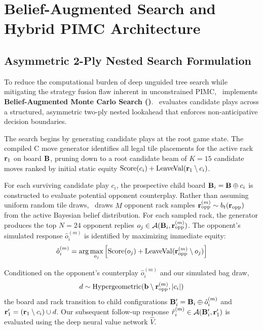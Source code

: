 \section{Belief-Augmented Search and Hybrid PIMC Architecture}
\label{sec:bams_search}

\subsection{Asymmetric 2-Ply Nested Search Formulation}

To reduce the computational burden of deep unguided tree search while mitigating the strategy fusion flaw inherent in unconstrained PIMC, \algo\ implements \textbf{Belief-Augmented Monte Carlo Search (\bams)}. \bams\ evaluates candidate plays across a structured, asymmetric two-ply nested lookahead that enforces non-anticipative decision boundaries.

The search begins by generating candidate plays at the root game state. The compiled C move generator identifies all legal tile placements for the active rack $\mathbf{r}_1$ on board $\mathbf{B}$, pruning down to a root candidate beam of $K = 15$ candidate moves ranked by initial static equity $\mathrm{Score}(c_i) + \mathrm{LeaveVal}(\mathbf{r}_1 \setminus c_i)$.

For each surviving candidate play $c_i$, the prospective child board $\mathbf{B}_i = \mathbf{B} \oplus c_i$ is constructed to evaluate potential opponent counterplay. Rather than assuming uniform random tile draws, \bams\ draws $M$ opponent rack samples $\mathbf{r}_{\mathrm{opp}}^{(m)} \sim b_t(\mathbf{r}_{\mathrm{opp}})$ from the active Bayesian belief distribution. For each sampled rack, the generator produces the top $N = 24$ opponent replies $o_j \in \mathcal{A}(\mathbf{B}_i, \mathbf{r}_{\mathrm{opp}}^{(m)})$. The opponent's simulated response $\hat{o}_i^{(m)}$ is identified by maximizing immediate equity:
\begin{equation}
    \hat{o}_i^{(m)} = \arg\max_{o_j} \Big[ \mathrm{Score}(o_j) + \mathrm{LeaveVal}(\mathbf{r}_{\mathrm{opp}}^{(m)} \setminus o_j) \Big]
\end{equation}

Conditioned on the opponent's counterplay $\hat{o}_i^{(m)}$ and our simulated bag draw,
\begin{equation}
    d \sim \mathrm{Hypergeometric}(\mathbf{b} \setminus \mathbf{r}_{\mathrm{opp}}^{(m)}, |c_i|)
\end{equation}
the board and rack transition to child configurations $\mathbf{B}_i' = \mathbf{B}_i \oplus \hat{o}_i^{(m)}$ and $\mathbf{r}_1' = (\mathbf{r}_1 \setminus c_i) \cup d$. Our subsequent follow-up response $\hat{r}_i^{(m)} \in \mathcal{A}(\mathbf{B}_i', \mathbf{r}_1')$ is evaluated using the deep neural value network $\hat{V}$.


